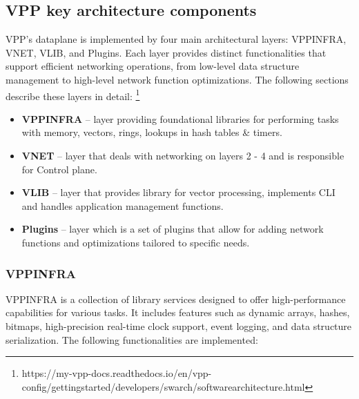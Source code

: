 \subsection{VPP key architecture components}

VPP's dataplane is implemented by four main architectural layers: VPPINFRA, VNET, VLIB, and Plugins. 
Each layer provides distinct functionalities that support efficient networking operations, from low-level data structure management to high-level network function optimizations. 
The following sections describe these layers in detail: \footnote{https://my-vpp-docs.readthedocs.io/en/vpp-config/gettingstarted/developers/swarch/softwarearchitecture.html}

\begin{itemize}
  \item \textbf{VPPINFRA} -- layer providing foundational libraries for performing tasks with memory, vectors, rings, lookups in hash tables \& timers.
  \item \textbf{VNET} -- layer that deals with networking on layers 2 - 4 and is responsible for Control plane.
  \item \textbf{VLIB} -- layer that provides library for vector processing, implements CLI and handles application management functions.
  \item \textbf{Plugins} -- layer which is a set of plugins that allow for adding network functions and optimizations tailored to specific needs.
\end{itemize}

\subsubsection{VPPINFRA}
VPPINFRA is a collection of library services designed to offer high-performance capabilities for various tasks. 
It includes features such as dynamic arrays, hashes, bitmaps, high-precision real-time clock support, event logging, and data structure serialization. The following functionalities are implemented:

